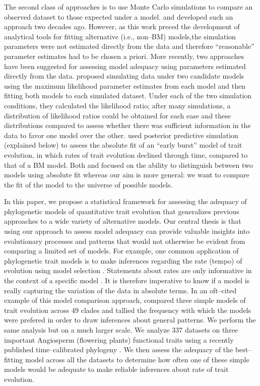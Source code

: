 \documentclass[a4paper,11pt]{article}
\begin{document}
The second class of approaches is to use Monte Carlo simulations to compare an observed dataset to those expected under a model. \citet{Garland1993} and \citet{Diaz1996} developed such an approach two decades ago. However, as this work preced the development of analytical tools for fitting alternative (i.e., non--BM) models,the simulation parameters were not estimated directly from the data and therefore ``reasonable'' parameter estimates had to be chosen a priori. More recently, two approaches have been suggested for assessing model adequacy using parameters estimated directly from the data. \citet{Boettiger2012} proposed simulating data under two candidate models using the maximum likelihood parameter estimates from each model and then fitting both models to each simulated dataset. Under each of the two simulation conditions, they calculated the likelihood ratio; after many simulations, a distribution of likelihood ratios could be obtained for each ease and these distributions compared to assess whether there was sufficient information in the data to favor one model over the other. \citet{SlaterPennell} used posterior predictive simulation (explained below) to assess the absolute fit of an ``early burst'' model of trait evolution, in which rates of trait evolution declined through time, compared to that of a BM model. Both \citet{Boettiger2012} and \citet{SlaterPennell} focused on the ability to distinguish between two models using absolute fit whereas our aim is more general: we want to compare the fit of the model to the universe of possible models. 

In this paper, we propose a statistical framework for assessing the adequacy of phylogenetic models of quantitative trait evolution that generalizes previous approaches to a wide variety of alternative models. Our central thesis is that using our approach to assess model adequacy can provide valuable insights into evolutionary processes and patterns that would not otherwise be evident from comparing a limited set of models. For example, one common application of phylogenetic trait models is to make inferences regarding the rate (tempo) of evolution using model selection \citep[e.g.,][]{Mooers1999, Harmon2010, Hunt2012, SlaterMEE}. Statements about rates are only informative in the context of a specific model \citep{Hunt2012}. It is therefore imperative to know if a model is really capturing the variation of the data in absolute terms. In an oft--cited example of this model comparison approach, \citet{Harmon2010} compared three simple models of trait evolution across 49 clades and tallied the frequency with which the models were prefered in order to draw inferences about general patterns. We perform the same analysis but on a much larger scale. We analyze 337 datasets on three important Angiosperm (flowering plants) functional traits using a recently published time--calibrated phylogeny \citep{Zanne2013}. We then assess the adequacy of the best--fitting model across all the datasets to determine how often one of these simple models would be adequate to make reliable inferences about rate of trait evolution.
 
\end{document}

